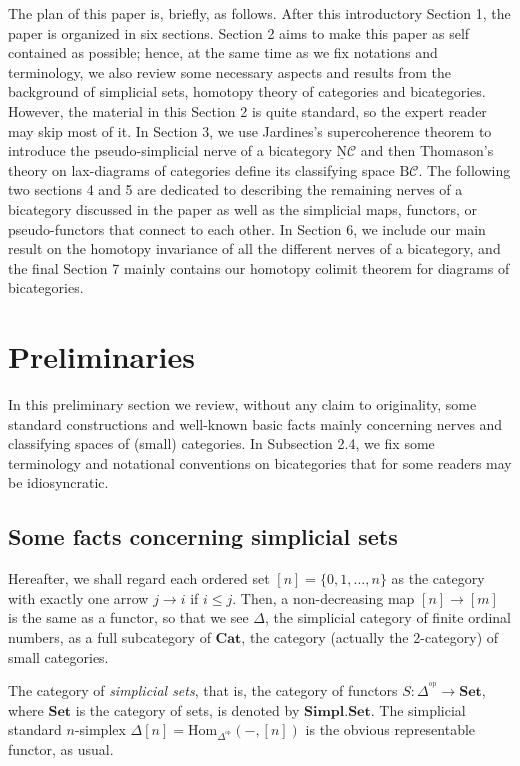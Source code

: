 \documentclass[]{amsart}
\begin{document}
The plan of this paper is, briefly, as follows. After this introductory Section 1, the paper is
organized in six sections. Section 2 aims to make this paper as self contained as possible; hence,
at the same time as we fix notations and terminology, we also review some necessary aspects and
results from the background of simplicial sets, homotopy theory of categories and bicategories.
However, the material in this Section 2 is quite standard, so the expert reader may skip most of
it. In Section 3, we use Jardines's supercoherence theorem \cite{jardine}  to introduce the
pseudo-simplicial nerve of a bicategory ${\ensuremath{\underline{\mathrm{N}}}}{\ensuremath{\mathcal{C}}}$ and then  Thomason's theory on lax-diagrams of
categories define its classifying space ${\ensuremath{\mathrm{B}}} {\ensuremath{\mathcal{C}}}$. The following two sections 4 and 5 are
dedicated to describing  the remaining nerves of a bicategory discussed in the paper as well as the
simplicial maps, functors, or pseudo-functors that connect to each other. In Section 6, we include
our main result on the homotopy invariance of all the different nerves of a bicategory, and the
final Section 7 mainly contains our homotopy colimit theorem for diagrams of bicategories.

\section{Preliminaries}

In this preliminary section we review, without any claim to originality, some standard
constructions and well-known basic facts mainly concerning nerves and classifying spaces of (small)
categories. In Subsection 2.4, we fix some terminology and notational conventions on bicategories
that for some readers may be idiosyncratic.

\subsection{Some facts concerning  simplicial sets}
Hereafter, we shall regard each ordered set $[n]=\{0,1,\ldots,n\}$ as the category with exactly one
arrow $j\rightarrow i$ if $i\leq j$. Then, a non-decreasing map $[n]\rightarrow [m]$ is the same as
a functor, so that we see $\Delta $, the simplicial category of finite ordinal numbers, as a full
subcategory of ${\ensuremath{\mathbf{Cat}}}$, the category (actually the 2-category) of small categories.

The category of {\em simplicial sets}, that is, the category of functors
${S:\Delta^{\!{^\mathrm{op}}}\to {\ensuremath{\mathbf{Set}}}}$, where ${\ensuremath{\mathbf{Set}}}$ is the category of sets, is denoted by
${\ensuremath{\mathbf{Simpl.Set}}}$.  The simplicial standard $n$-simplex
$\Delta[n]=\mbox{Hom}_{\Delta^{\!{^\mathrm{op}}}}(-,[n])$ is the obvious representable functor, as
usual.
\end{document}
